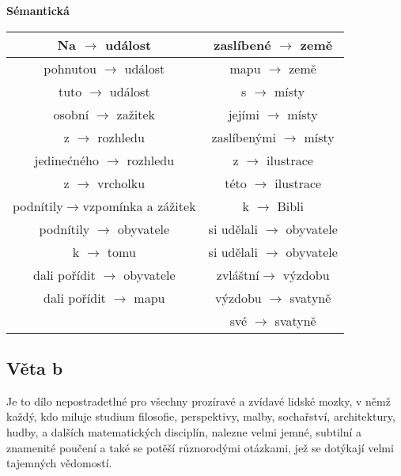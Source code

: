 \documentclass[12pt,a4paper]{article}
\theoremstyle{definition}
\begin{document}
\textbf{S\'{e}mantick\'{a}} \\
\begin{tabular}{|c||c|} 
\hline
Na  $ \rightarrow $ ud\'{a}lost & zasl\'{i}ben\'{e} $ \rightarrow $ zem\v{e} \\ 
\hline
pohnutou $ \rightarrow $ ud\'{a}lost & mapu $ \rightarrow $ zem\v{e}  \\ 
\hline
 tuto $ \rightarrow $ ud\'{a}lost & s $ \rightarrow $ m\'{i}sty  \\ 
\hline
 osobn\'{i}  $ \rightarrow $ za\v{z}itek &  jej\'{i}mi $ \rightarrow $ m\'{i}sty \\
\hline
 z $ \rightarrow $  rozhledu & zasl\'{i}ben\'{y}mi $ \rightarrow $ m\'{i}sty  \\
\hline
 jedine\'{c}n\'{e}ho $ \rightarrow $  rozhledu  & z $ \rightarrow $ ilustrace \\
\hline
z $ \rightarrow $ vrcholku  & t\'{e}to $ \rightarrow $ ilustrace \\
\hline
podn\'{i}tily$ \rightarrow $vzpom\'{i}nka a z\'{a}\v{z}itek & k $ \rightarrow $ Bibli \\
\hline
 podn\'{i}tily  $ \rightarrow $ obyvatele & si ud\v{e}lali $ \rightarrow $ obyvatele \\
\hline
k $ \rightarrow $ tomu  & si ud\v{e}lali $ \rightarrow $ obyvatele \\
\hline
 dali po\v{r}\'{i}dit $ \rightarrow $ obyvatele  & zvl\'{a}\v{s}tn\'{i}$ \rightarrow $ v\'{y}zdobu\\
\hline
 dali po\v{r}\'{i}dit $ \rightarrow $ mapu & v\'{y}zdobu $ \rightarrow $ svatyn\v{e} \\
\hline
   & sv\'{e} $ \rightarrow $ svatyn\v{e} \\
\hline
\hline
\end{tabular}
\clearpage
\subsection{V\v{e}ta b}
Je to d\'{i}lo nepostradetln\'{e} pro v\v{s}echny proz\'{i}rav\'{e} a zv\'{i}dav\'{e} lidsk\'{e} mozky, v n\v{e}m\v{z} ka\v{z}d\'{y}, kdo miluje studium filosofie, perspektivy, malby, socha\v{r}stv\'{i}, architektury, hudby, a dal\v{s}\'{i}ch matematick\'{y}ch discipl\'{i}n, nalezne velmi jemn\'{e}, subtiln\'{i} a znamenit\'{e} pou\v{c}en\'{i} a tak\'{e} se pot\v{e}\v{s}\'{i} r\r{u}znorod\'{y}mi ot\'{a}zkami, je\v{z} se dot\'{y}kaj\'{i} velmi tajemn\'{y}ch v\v{e}domost\'{i}.
\end{document}

